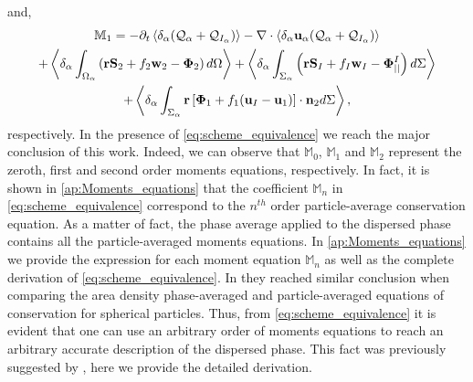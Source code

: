 and,
\begin{multline*}
    \mathbb{M}_1 =
    - \partial_t \left<\delta_\alpha (\mathcal{Q}_\alpha+\mathcal{Q}_{I_\alpha})\right>
    - \mathbf{\nabla} \cdot \left<\delta_\alpha\textbf{u}_\alpha(\mathcal{Q}_\alpha+\mathcal{Q}_{I_\alpha})\right>
    \\ + \left<\delta_\alpha\int_{\Omega_\alpha} \left(
        \textbf{r} \textbf{S}_2         
        + f_2  \textbf{w}_2 
        - \mathbf{\Phi}_2
    \right) d\Omega\right>
    + \left<\delta_\alpha\int_{\Sigma_\alpha} \left(
        \textbf{r}\textbf{S}_I
        + f_I \textbf{w}_I
        - \mathbf{\Phi}_{||}^I
    \right) d\Sigma\right>\\
    + \left<\delta_\alpha\int_{\Sigma_\alpha} \textbf{r} \left[
        \mathbf{\Phi}_1
        + f_1 (\textbf{u}_I-\textbf{u}_1)
    \right]\cdot \textbf{n}_2  d\Sigma\right>,
\end{multline*}
respectively. 
In the presence of \ref{eq:scheme_equivalence} we reach the major conclusion of this work. 
Indeed, we can observe that $\mathbb{M}_0$, $\mathbb{M}_1$ and $\mathbb{M}_2$ represent the zeroth, first and second order moments equations, respectively. 
In fact, it is shown in \ref{ap:Moments_equations} that the coefficient $\mathbb{M}_n$ in \ref{eq:scheme_equivalence} correspond to the $n^{th}$ order particle-average conservation equation. 
As a matter of fact, the phase average applied to the dispersed phase contains all the particle-averaged moments equations.
In \ref{ap:Moments_equations} we provide the expression for each moment equation $\mathbb{M}_n$ as well as the complete derivation of \ref{eq:scheme_equivalence}. 
In \cite{lhuillier2000bilan} they reached similar conclusion when comparing the area density phase-averaged and particle-averaged equations of conservation for spherical particles. 
Thus, from \ref{eq:scheme_equivalence} it is evident that one can use an arbitrary order of moments equations to reach an arbitrary accurate description of the dispersed phase.
This fact was previously suggested by \citet{zhang1997momentum}, here we provide the detailed derivation.  

